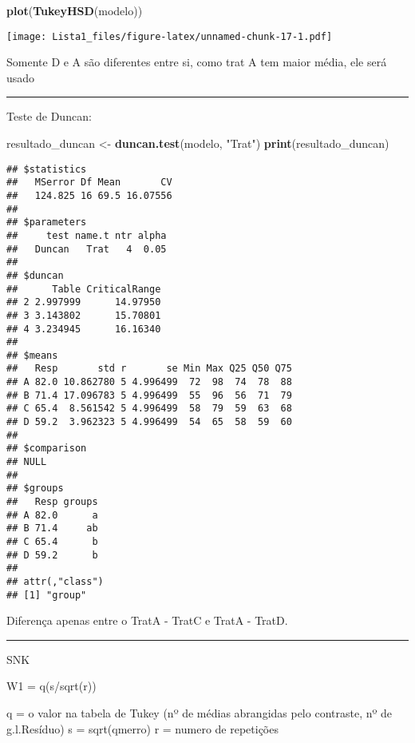 \documentclass[
]{article}
\newenvironment{Shaded}{\begin{snugshade}}{\end{snugshade}}
\newcommand{\FunctionTok}[1]{\textcolor[rgb]{0.13,0.29,0.53}{\textbf{#1}}}
\newcommand{\NormalTok}[1]{#1}
\newcommand{\OtherTok}[1]{\textcolor[rgb]{0.56,0.35,0.01}{#1}}
\newcommand{\StringTok}[1]{\textcolor[rgb]{0.31,0.60,0.02}{#1}}
\begin{document}
\begin{Shaded}
\begin{Highlighting}[]
\FunctionTok{plot}\NormalTok{(}\FunctionTok{TukeyHSD}\NormalTok{(modelo))}
\end{Highlighting}
\end{Shaded}

\texttt{[image: Lista1\_files/figure-latex/unnamed-chunk-17-1.pdf]}

Somente D e A são diferentes entre si, como trat A tem maior média, ele
será usado

\begin{center}\rule{0.5\linewidth}{0.5pt}\end{center}

Teste de Duncan:

\begin{Shaded}
\begin{Highlighting}[]
\NormalTok{resultado\_duncan }\OtherTok{\textless{}{-}} \FunctionTok{duncan.test}\NormalTok{(modelo, }\StringTok{"Trat"}\NormalTok{)}
\FunctionTok{print}\NormalTok{(resultado\_duncan)}
\end{Highlighting}
\end{Shaded}

\begin{verbatim}
## $statistics
##   MSerror Df Mean       CV
##   124.825 16 69.5 16.07556
## 
## $parameters
##     test name.t ntr alpha
##   Duncan   Trat   4  0.05
## 
## $duncan
##      Table CriticalRange
## 2 2.997999      14.97950
## 3 3.143802      15.70801
## 4 3.234945      16.16340
## 
## $means
##   Resp       std r       se Min Max Q25 Q50 Q75
## A 82.0 10.862780 5 4.996499  72  98  74  78  88
## B 71.4 17.096783 5 4.996499  55  96  56  71  79
## C 65.4  8.561542 5 4.996499  58  79  59  63  68
## D 59.2  3.962323 5 4.996499  54  65  58  59  60
## 
## $comparison
## NULL
## 
## $groups
##   Resp groups
## A 82.0      a
## B 71.4     ab
## C 65.4      b
## D 59.2      b
## 
## attr(,"class")
## [1] "group"
\end{verbatim}

Diferença apenas entre o TratA - TratC e TratA - TratD.

\begin{center}\rule{0.5\linewidth}{0.5pt}\end{center}

SNK

W1 = q(s/sqrt(r))

q = o valor na tabela de Tukey (nº de médias abrangidas pelo contraste,
nº de g.l.Resíduo) s = sqrt(qmerro) r = numero de repetições
\end{document}
